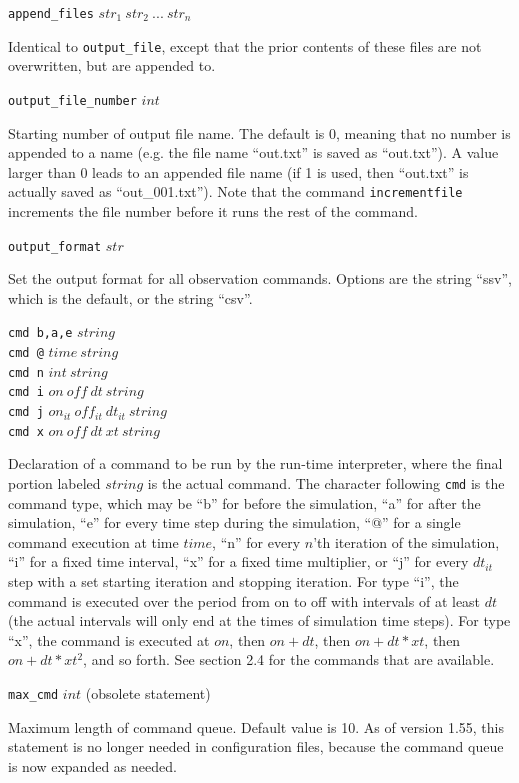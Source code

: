 \documentclass {scrbook}
\newcommand {\ttt} {\texttt}
\begin{document}
\begin{description}
\item{\ttt{append\_files} $str_1\ str_2\ ...\ str_n$}

Identical to \ttt{output\_file}, except that the prior contents of these files are not overwritten, but are appended to.

\item{\ttt{output\_file\_number} $int$}

Starting number of output file name. The default is 0, meaning that no number is appended to a name (e.g. the file name ``out.txt'' is saved as ``out.txt''). A value larger than 0 leads to an appended file name (if 1 is used, then ``out.txt'' is actually saved as ``out\_001.txt''). Note that the command \ttt{incrementfile} increments the file number before it runs the rest of the command.

\item{\ttt{output\_format} $str$}

Set the output format for all observation commands. Options are the string ``ssv'', which is the default, or the string ``csv''.

\item{\ttt{cmd b,a,e} $string$\\
\ttt{cmd @} $time\ string$\\
\ttt{cmd n} $int\ string$\\
\ttt{cmd i} $on\ off\ dt\ string$\\
\ttt{cmd j} $on_{it}\ off_{it}\ dt_{it}\ string$\\
\ttt{cmd x} $on\ off\ dt\ xt\ string$}

Declaration of a command to be run by the run-time interpreter, where the final portion labeled $string$ is the actual command. The character following \ttt{cmd} is the command type, which may be ``b'' for before the simulation, ``a'' for after the simulation, ``e'' for every time step during the simulation, ``@'' for a single command execution at time $time$, ``n'' for every $n$'th iteration of the simulation, ``i'' for a fixed time interval, ``x'' for a fixed time multiplier, or ``j'' for every $dt_{it}$ step with a set starting iteration and stopping iteration. For type ``i'', the command is executed over the period from on to off with intervals of at least $dt$ (the actual intervals will only end at the times of simulation time steps). For type ``x'', the command is executed at $on$, then $on+dt$, then $on+dt*xt$, then $on+dt*xt^2$, and so forth. See section 2.4 for the commands that are available.

\item{\ttt{max\_cmd} $int$ (obsolete statement)}

Maximum length of command queue. Default value is 10. As of version 1.55, this statement is no longer needed in configuration files, because the command queue is now expanded as needed.

\end{description}
\end{document}
